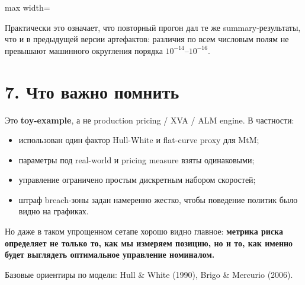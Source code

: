 \documentclass[11pt,a4paper]{article}
\newenvironment{fittable}[1][\small]{%
  \par\medskip
  \begin{center}
  #1
  \setlength{\tabcolsep}{4.5pt}%
  \renewcommand{\arraystretch}{1.10}%
  \begin{adjustbox}{max width=\linewidth}
}{%
  \end{adjustbox}
  \end{center}
  \par\medskip
}
\begin{document}
\begin{fittable}

\end{fittable}

Практически это означает, что повторный прогон дал те же summary-результаты, что и в предыдущей версии артефактов: различия по всем числовым полям не превышают машинного округления порядка $10^{-14}$--$10^{-16}$.

\section*{7. Что важно помнить}

Это \textbf{toy-example}, а не production pricing / XVA / ALM engine. В частности:
\begin{itemize}
  \item использован один фактор Hull-White и flat-curve proxy для MtM;
  \item параметры под real-world и pricing measure взяты одинаковыми;
  \item управление ограничено простым дискретным набором скоростей;
  \item штраф breach-зоны задан намеренно жестко, чтобы поведение политик было видно на графиках.
\end{itemize}
Но даже в таком упрощенном сетапе хорошо видно главное: \textbf{метрика риска определяет не только то, как мы измеряем позицию, но и то, как именно будет выглядеть оптимальное управление номиналом.}

{\small Базовые ориентиры по модели: Hull \& White (1990), Brigo \& Mercurio (2006).}
\end{document}
